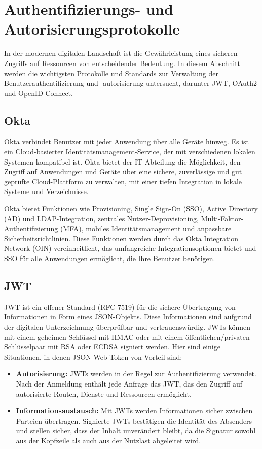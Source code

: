\section{Authentifizierungs- und Autorisierungsprotokolle}

In der modernen digitalen Landschaft ist die Gewährleistung eines sicheren Zugriffs auf Ressourcen von entscheidender Bedeutung. In diesem Abschnitt werden die wichtigsten Protokolle und Standards zur Verwaltung der Benutzerauthentifizierung und -autorisierung untersucht, darunter JWT, OAuth2 und OpenID Connect.

\subsection{Okta}
Okta verbindet Benutzer mit jeder Anwendung über alle Geräte hinweg. Es ist ein Cloud-basierter Identitätsmanagement-Service, der mit verschiedenen lokalen Systemen kompatibel ist. Okta bietet der IT-Abteilung die Möglichkeit, den Zugriff auf Anwendungen und Geräte über eine sichere, zuverlässige und gut geprüfte Cloud-Plattform zu verwalten, mit einer tiefen Integration in lokale Systeme und Verzeichnisse.

Okta bietet Funktionen wie Provisioning, Single Sign-On (SSO), Active Directory (AD) und LDAP-Integration, zentrales Nutzer-Deprovisioning, Multi-Faktor-Authentifizierung (MFA), mobiles Identitätsmanagement und anpassbare Sicherheitsrichtlinien. Diese Funktionen werden durch das Okta Integration Network (OIN) vereinheitlicht, das umfangreiche Integrationsoptionen bietet und SSO für alle Anwendungen ermöglicht, die Ihre Benutzer benötigen\cite{Okta:o.J}.

\subsection{JWT}

JWT ist ein offener Standard (RFC 7519) für die sichere Übertragung von Informationen in Form eines JSON-Objekts. Diese Informationen sind aufgrund der digitalen Unterzeichnung überprüfbar und vertrauenswürdig. JWTs können mit einem geheimen Schlüssel mit HMAC oder mit einem öffentlichen/privaten Schlüsselpaar mit RSA oder ECDSA signiert werden. Hier sind einige Situationen, in denen JSON-Web-Token von Vorteil sind:

\begin{itemize}
	\item \textbf{Autorisierung:}  JWTs werden in der Regel zur Authentifizierung verwendet. Nach der Anmeldung enthält jede Anfrage das JWT, das den Zugriff auf autorisierte Routen, Dienste und Ressourcen ermöglicht.
	\item \textbf{Informationsaustausch:} Mit JWTs werden Informationen sicher zwischen Parteien übertragen. Signierte JWTs bestätigen die Identität des Absenders und stellen sicher, dass der Inhalt unverändert bleibt, da die Signatur sowohl aus der Kopfzeile als auch aus der Nutzlast abgeleitet wird\cite{JWT:o.J}.
\end{itemize}

